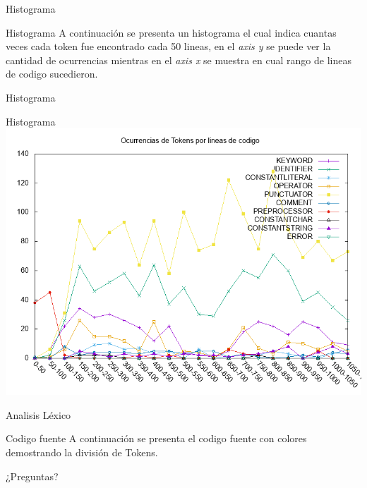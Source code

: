\documentclass[10pt,xcolor={dvipsnames}]{beamer}
\begin{document}
\begin{frame}{Histograma}
\begin{alertblock}{Histograma}
	A continuación se presenta un histograma el cual indica cuantas veces cada token fue encontrado cada 50 lineas, en el \textit{axis y} se puede ver la cantidad de ocurrencias mientras en el \textit{axis x} se muestra en cual rango de lineas de codigo sucedieron.
	\end{alertblock}
\end{frame}
\begin{frame}{Histograma}
\begin{alertblock}{Histograma}
	\includegraphics[scale=0.4]{histogram.png}
	\end{alertblock}
\end{frame}

\begin{frame}{Analisis Léxico}
\begin{alertblock}{Codigo fuente}
	A continuación se presenta el codigo fuente con colores demostrando la división de Tokens.
	\end{alertblock}
\end{frame}



{
\begin{frame}[standout]
  ¿Preguntas?
\end{frame}
}
\end{document}
